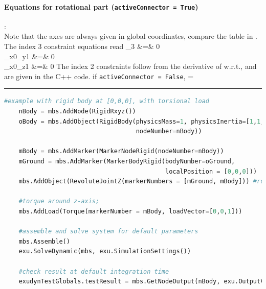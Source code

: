     \paragraph{Equations for rotational part (\texttt{activeConnector = True})}:\\
    Note that the axes are always given in global coordinates, compare the table in .
    The index 3 constraint equations read
    \bea \label{eq:ObjectJointRevoluteZ:index3}
       \lambda_3 &=& 0 \\
       _{x0}\tp {}_{y1} &=& 0 \\
       _{x0}\tp {}_{z1} &=& 0
    \eea
    The index 2 constraints follow from the derivative of  w.r.t., and are given in the C++ code.
%    
    if \texttt{activeConnector = False}, 
    \be
      \zv = \Null
    \ee
\vspace{6pt}\par\noindent\rule{\textwidth}{0.4pt}
\label{miniExample_ObjectJointRevoluteZ}
\pythonstyle
\begin{lstlisting}[language=Python, firstnumber=1]
    #example with rigid body at [0,0,0], with torsional load
    nBody = mbs.AddNode(RigidRxyz())
    oBody = mbs.AddObject(RigidBody(physicsMass=1, physicsInertia=[1,1,1,0,0,0], 
                                    nodeNumber=nBody))
    
    mBody = mbs.AddMarker(MarkerNodeRigid(nodeNumber=nBody))
    mGround = mbs.AddMarker(MarkerBodyRigid(bodyNumber=oGround, 
                                            localPosition = [0,0,0]))
    mbs.AddObject(RevoluteJointZ(markerNumbers = [mGround, mBody])) #rotation around ground Z-axis

    #torque around z-axis; 
    mbs.AddLoad(Torque(markerNumber = mBody, loadVector=[0,0,1])) 

    #assemble and solve system for default parameters
    mbs.Assemble()
    exu.SolveDynamic(mbs, exu.SimulationSettings())
    
    #check result at default integration time
    exudynTestGlobals.testResult = mbs.GetNodeOutput(nBody, exu.OutputVariableType.Rotation)[2]

\end{lstlisting}

